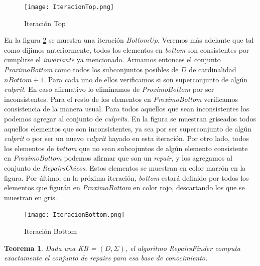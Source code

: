 \documentclass[11pt,a4paper,twoside]{tesis}
\begin{document}
\begin{figure}[ht]
    \texttt{[image: IteracionTop.png]}
    \centering
    \caption{Iteración Top}
    \label{fig:iteracion_top}
\end{figure}

En la figura \ref{fig:iteracion_bottom} se muestra una iteración \textit{BottomUp}. Veremos más adelante que tal como dijimos anteriormente, todos los elementos en \textit{bottom} son consistentes por cumplirse el \textit{invariante} ya mencionado. Armamos entonces el conjunto \textit{ProximoBottom} como todos los subconjuntos posibles de $D$ de cardinalidad $nBottom + 1$. Para cada uno de ellos verificamos si son superconjunto de algún \textit{culprit}. En caso afirmativo lo eliminamos de \textit{ProximoBottom} por ser inconsistentes. Para el resto de los elementos en \textit{ProximoBottom} verificamos consistencia de la manera usual. Para todos aquellos que sean inconsistentes los podemos agregar al conjunto de \textit{culprits}. En la figura se muestran griseados todos aquellos elementos que son inconsistentes, ya sea por ser superconjunto de algún \textit{culprit} o por ser un nuevo \textit{culprit} hayado en esta iteración.
Por otro lado, todos los elementos de \textit{bottom} que no sean subcojuntos de algún elemento consistente en \textit{ProximoBottom} podemos afirmar que son un \textit{repair}, y los agregamos al conjunto de \textit{RepairsChicos}. Estos elementos se muestran en color marrón en la figura. Por último, en la próxima iteración, \textit{bottom} estará definido por todos los elementos que figurán en \textit{ProximoBottom} en color rojo, descartando los que se muestran en gris.


\begin{figure}[ht]
    \texttt{[image: IteracionBottom.png]}
    \centering
    \caption{Iteración Bottom}
    \label{fig:iteracion_bottom}
\end{figure}


\newtheorem{theorem}{Teorema} 
\newtheorem{lemma}[theorem]{Lema}

\begin{theorem}
Dada una \textit{KB} = $(D, \Sigma)$, el algoritmo \textit{RepairsFinder} computa exactamente el conjunto de \textit{repairs} para esa base de conocimiento.
\end{theorem}
\end{document}
